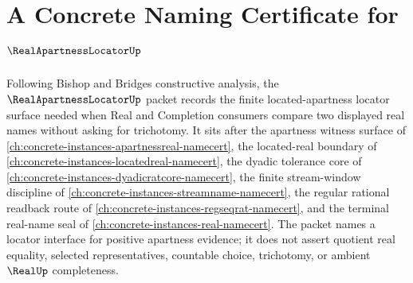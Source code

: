 \chapter{A Concrete Naming Certificate for $\RealApartnessLocatorUp$}
\label{ch:concrete-instances-real-apartness-locator-namecert}

Following Bishop and Bridges constructive analysis, the $\RealApartnessLocatorUp$ packet records the finite located-apartness locator surface needed when Real and Completion consumers compare two displayed real names without asking for trichotomy. It sits after the apartness witness surface of \autoref{ch:concrete-instances-apartnessreal-namecert}, the located-real boundary of \autoref{ch:concrete-instances-locatedreal-namecert}, the dyadic tolerance core of \autoref{ch:concrete-instances-dyadicratcore-namecert}, the finite stream-window discipline of \autoref{ch:concrete-instances-streamname-namecert}, the regular rational readback route of \autoref{ch:concrete-instances-regseqrat-namecert}, and the terminal real-name seal of \autoref{ch:concrete-instances-real-namecert}. The packet names a locator interface for positive apartness evidence; it does not assert quotient real equality, selected representatives, countable choice, trichotomy, or ambient $\RealUp$ completeness.

